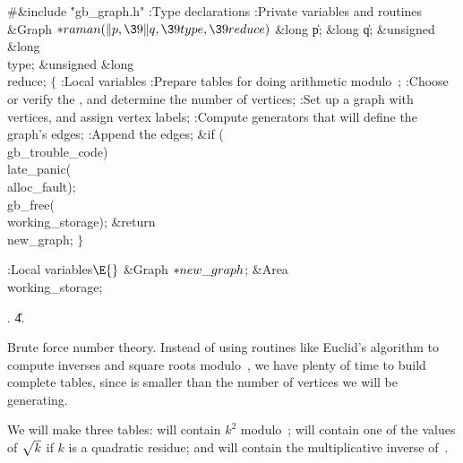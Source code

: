 \Y\B\8\#\&{include} \.{"gb\_graph.h"}\6
\ATH\7
:Type declarations\X\6
:Private variables and routines\X\7
\1\1\&{Graph} ${}{*}\\{raman}(\|p,\39\|q,\39\\{type},\39\\{reduce}){}$\6
\&{long} \|p;\6
\&{long} \|q;\6
\&{unsigned} \&{long} \\{type};\6
\&{unsigned} \&{long} \\{reduce};\2\2\6
${}\{{}$\5
\1:Local variables\X\7
:Prepare tables for doing arithmetic modulo~\X;\6
:Choose or verify the , and determine the number  of
vertices\X;\6
:Set up a graph with  vertices, and assign vertex labels\X;\6
:Compute  generators that will define the graph's edges\X;\6
:Append the edges\X;\6
\&{if} (\\{gb\_trouble\_code})\1\5
\\{late\_panic}(\\{alloc\_fault});\2\6
\\{gb\_free}(\\{working\_storage});\6
\&{return} \\{new\_graph};\6
\4${}\}{}$\2\par
\fi

\B{}:Local variables\X${}\E{}$\6
\&{Graph} ${}{*}\\{new\_graph}{}$;%
\6
\&{Area} \\{working\_storage};\par
{}.
\U4.\fi

Brute force number theory. Instead of using routines like Euclid's
algorithm to compute inverses and square roots modulo~, we have
plenty of time to build complete tables, since  is smaller than
the number of vertices we will be generating.

We will make three tables:  will contain $k^2$ modulo~;
 will contain one of the values of $\sqrt{\mathstrut k}$
if $k$ is a quadratic residue; and  will contain the
multiplicative
inverse of~.

